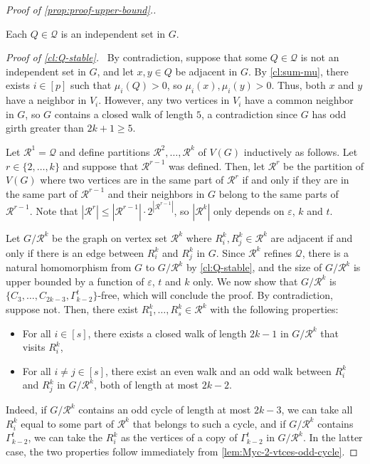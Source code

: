 \documentclass{article}
\newcommand{\mydiamond}{\rotatebox[origin=c]{45}{$\vcenter{\hbox{$\Box$}}$}}
\newenvironment{subproof}[1]{\par\noindent \textit{Proof of #1.}\ }{\hfill \mydiamond \par\vspace{11pt}}
\begin{document}
\begin{proof}[Proof of \cref{prop:proof-upper-bound}.]
    \begin{claim}\label{cl:Q-stable}
        Each $Q \in \mathcal{Q}$ is an independent set in $G$.
    \end{claim}

    \begin{subproof}{\cref{cl:Q-stable}}
        By contradiction, suppose that some $Q \in \mathcal{Q}$ is not an independent set in $G$, and let $x, y \in Q$ be adjacent in $G$.
        By \cref{cl:sum-mu}, there exists $i \in [p]$ such that $\mu_i(Q) > 0$, so $\mu_i(x), \mu_i(y) > 0$.
        Thus, both $x$ and $y$ have a neighbor in $V_i$.
        However, any two vertices in $V_i$ have a common neighbor in $G$, so $G$ contains a closed walk of length $5$, a contradiction since $G$ has odd girth greater than $2k+1 \geq 5$.
    \end{subproof}
    
    Let $\mathcal{R}^1 = \mathcal{Q}$ and define partitions $\mathcal{R}^2, \ldots, \mathcal{R}^k$ of $V(G)$ inductively as follows.
    Let $r \in \{2, \ldots, k\}$ and suppose that $\mathcal{R}^{r-1}$ was defined.
    Then, let $\mathcal{R}^{r}$ be the partition of $V(G)$ where two vertices are in the same part of $\mathcal{R}^r$ if and only if they are in the same part of $\mathcal{R}^{r-1}$ and their neighbors in $G$ belong to the same parts of $\mathcal{R}^{r-1}$.
    Note that $|\mathcal{R}^r| \leq |\mathcal{R}^{r-1}| \cdot 2^{|\mathcal{R}^{r-1}|}$, so $|\mathcal{R}^k|$ only depends on $\varepsilon$, $k$ and $t$.

    Let $G/\mathcal{R}^k$ be the graph on vertex set $\mathcal{R}^k$ where $R^k_i, R^k_j \in \mathcal{R}^k$ are adjacent if and only if there is an edge between $R^k_i$ and $R^k_j$ in $G$.
    Since $\mathcal{R}^k$ refines $\mathcal{Q}$, there is a natural homomorphism from $G$ to $G/\mathcal{R}^k$ by \cref{cl:Q-stable}, and the size of $G/\mathcal{R}^k$ is upper bounded by a function of $\varepsilon$, $t$ and $k$ only.
    We now show that $G/\mathcal{R}^k$ is $\{C_3, \ldots, C_{2k-3}, \Gamma_{k-2}^t\}$-free, which will conclude the proof. 
    By contradiction, suppose not.
    Then, there exist $R^k_1, \ldots, R^k_{s} \in \mathcal{R}^k$ with the following properties: \begin{itemize}
        \item For all $i \in [s]$, there exists a closed walk of length $2k-1$ in $G/\mathcal{R}^k$ that visits $R^k_i$,
        \item For all $i \neq j \in [s]$, there exist an even walk and an odd walk between $R^k_i$ and $R^k_j$ in $G/\mathcal{R}^k$, both of length at most $2k-2$.
    \end{itemize}
    Indeed, if $G/\mathcal{R}^k$ contains an odd cycle of length at most $2k-3$, we can take all $R^k_i$ equal to some part of $\mathcal{R}^k$ that belongs to such a cycle, and if $G/\mathcal{R}^k$ contains $\Gamma_{k-2}^t$, we can take the $R^k_i$ as the vertices of a copy of $\Gamma_{k-2}^t$ in $G/\mathcal{R}^k$. In the latter case, the two properties follow immediately from \cref{lem:Myc-2-vtces-odd-cycle}.


\end{proof}
\end{document}
